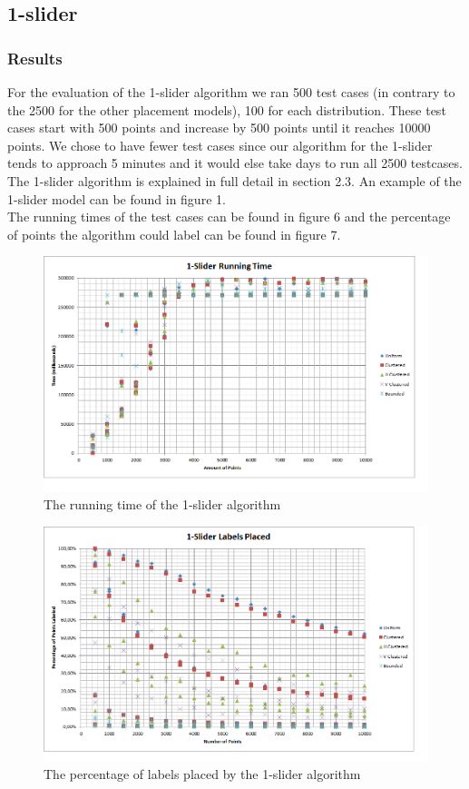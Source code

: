 \documentclass[crop=false,a4paper,oneside,11pt]{standalone}
\begin{document}
\subsection{1-slider}
\subsubsection{Results}
For the evaluation of the 1-slider algorithm we ran 500 test cases (in contrary to the 2500 for the other placement models), 100 for each distribution. These test cases start with 500 points and increase by 500 points until it reaches 10000 points. We chose to have fewer test cases since our algorithm for the 1-slider tends to approach 5 minutes and it would else take days to run all 2500 testcases. The 1-slider algorithm is explained in full detail in section 2.3. An example of the 1-slider model can be found in figure 1.\\
 The running times of the test cases can be found in figure 6 and the percentage of points the algorithm could label can be found in figure 7.

 \begin{figure}[H]
 \centering
 \centerline{\includegraphics[scale = 0.65]{1slider.png}}
 \caption{The running time of the 1-slider algorithm}
 \end{figure}

 \begin{figure}[H]
 \centering
  \centerline{\includegraphics[scale = 0.65]{1sliderplaced.png}}
  \caption{The percentage of labels placed by the 1-slider algorithm}
 \end{figure}
\end{document}
